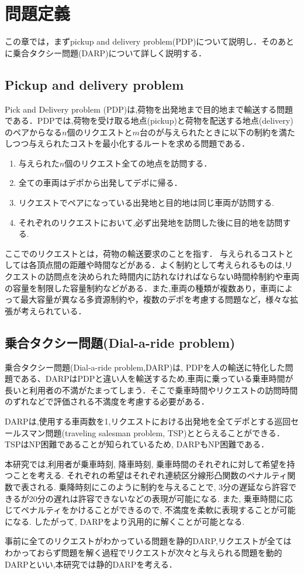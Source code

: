 \chapter{問題定義}\label{definition}
この章では，まずpickup and delivery problem(PDP)について説明し．そのあとに乗合タクシー問題(DARP)について詳しく説明する．
\section{Pickup and delivery problem}
Pick and Delivery problem (PDP)は,荷物を出発地まで目的地まで輸送する問題である．PDPでは,荷物を受け取る地点(pickup)と荷物を配送する地点(delivery)のペアからなる$n$個のリクエストと$m$台のが与えられたときに以下の制約を満たしつつ与えられたコストを最小化するルートを求める問題である．
\begin{enumerate}
 \item 与えられた$n$個のリクエスト全ての地点を訪問する．
 \item 全ての車両はデポから出発してデポに帰る．
 \item リクエストでペアになっている出発地と目的地は同じ車両が訪問する.
 \item それぞれのリクエストにおいて,必ず出発地を訪問した後に目的地を訪問する.
\end{enumerate}
ここでのリクエストとは，荷物の輸送要求のことを指す．
与えられるコストとしては各頂点間の距離や時間などがある．よく制約として考えられるものは,リクエストの訪問点を決められた時間内に訪れなければならない時間枠制約や車両の容量を制限した容量制約などがある．また,車両の種類が複数あり，車両によって最大容量が異なる多資源制約や，複数のデポを考慮する問題など，様々な拡張が考えられている．

\section{乗合タクシー問題(Dial-a-ride problem)}
乗合タクシー問題(Dial-a-ride problem,DARP)は, PDPを人の輸送に特化した問題である、DARPはPDPと違い人を輸送するため,車両に乗っている乗車時間が長いと利用者の不満がたまってしまう．そこで乗車時間やリクエストの訪問時間のずれなどで評価される不満度を考慮する必要がある．

DARPは,使用する車両数を1,リクエストにおける出発地を全てデポとする巡回セールスマン問題(traveling salesman problem, TSP)ととらえることができる．TSPはNP困難\cite{TSP}であることが知られているため, DARPもNP困難である．

本研究では,利用者が乗車時刻, 降車時刻, 乗車時間のそれぞれに対して希望を持つことを考える. それぞれの希望はそれぞれ連続区分線形凸関数のペナルティ関数で表される. 乗降時刻にこのように制約を与えることで, 3分の遅延なら許容できるが20分の遅れは許容できないなどの表現が可能になる. また, 乗車時間に応じてペナルティをかけることができるので, 不満度を柔軟に表現することが可能になる. したがって, DARPをより汎用的に解くことが可能となる.

事前に全てのリクエストがわかっている問題を静的DARP,リクエストが全てはわかっておらず問題を解く過程でリクエストが次々と与えられる問題を動的DARPといい,本研究では静的DARPを考える．

